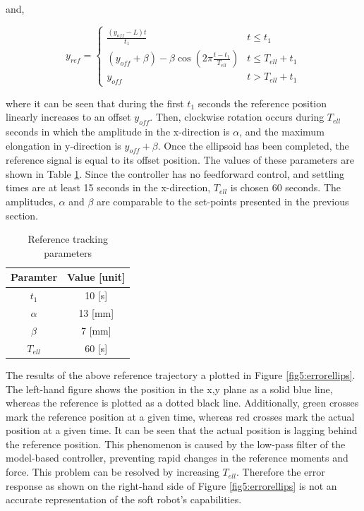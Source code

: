 and,


\begin{equation}
    y_{ref} = \begin{cases} 
      \frac{(y_{off} - L) t}{t_1} &  t \leq t_1 \\
     (y_{off} +\beta) -  \beta \cos(2\pi \frac{t - t_1}{T_{ell}}) & t \leq T_{ell} + t_1 \\
     y_{off} & t > T_{ell} + t_1
   \end{cases} 
\end{equation}


where it can be seen that during the first $t_1$ seconds the reference position linearly increases to an offset $y_{off}$. Then, clockwise rotation occurs during $T_{ell}$ seconds in which the amplitude in the x-direction is $\alpha$, and the maximum elongation in y-direction is $y_{off} + \beta$. Once the ellipsoid has been completed, the reference signal is equal to its offset position. The values of these parameters are shown in Table \ref{tab5:refparams}. Since the controller has no feedforward control, and settling times are at least 15 seconds in the x-direction, $T_{ell}$ is chosen 60 seconds. The amplitudes, $\alpha$ and $\beta$ are comparable to the set-points presented in the previous section. 


\begin{table}[H]
    \centering
    \caption{Reference tracking parameters}
    \begin{tabular}{|c|c|} \hline
   \textbf{Paramter}  & \textbf{Value [unit]} \\ \hline
    $t_1$ &   10 [s]  \\ 
    $\alpha$ & 13 [mm] \\
    $\beta$ & 7 [mm] \\
    $T_{ell}$ & 60 [s] \\ \hline
\end{tabular}
    \label{tab5:refparams}
\end{table}

The results of the above reference trajectory a plotted in Figure \ref{fig5:errorellips}. The left-hand figure shows the position in the x,y plane as a solid blue line, whereas the reference is plotted as a dotted black line. Additionally, green crosses mark the reference position at a given time, whereas red crosses mark the actual position at a given time. It can be seen that the actual position is lagging behind the reference position. This phenomenon is caused by the low-pass filter of the model-based controller, preventing rapid changes in the reference moments and force. This problem can be resolved by increasing $T_{ell}$. Therefore the error response as shown on the right-hand side of Figure \ref{fig5:errorellips} is not an accurate representation of the soft robot's capabilities.

